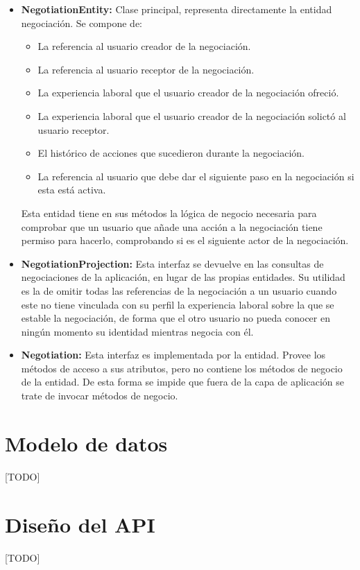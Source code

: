 \documentclass[a4paper, 12pt]{book}
\begin{document}
	\begin{itemize}
	\item \textbf{NegotiationEntity:} Clase principal, representa directamente la entidad negociación. 
	Se compone de:
		\begin{itemize}
		\item La referencia al usuario creador de la negociación.
		\item La referencia al usuario receptor de la negociación.
		\item La experiencia laboral que el usuario creador de la negociación ofreció.
		\item La experiencia laboral que el usuario creador de la negociación solictó al usuario receptor.
		\item El histórico de acciones que sucedieron durante la negociación.
		\item La referencia al usuario que debe dar el siguiente paso en la negociación si esta está activa.
		\end{itemize}
	Esta entidad tiene en sus métodos la lógica de negocio necesaria para comprobar que un usuario que añade una acción a la negociación tiene permiso para hacerlo, comprobando si es el siguiente actor de la negociación.
	\item \textbf{NegotiationProjection:} Esta interfaz se devuelve en las consultas de negociaciones de la aplicación, en lugar de las propias entidades.
	 Su utilidad es la de omitir todas las referencias de la negociación a un usuario cuando este no tiene vinculada con su perfil la experiencia laboral sobre la que se estable la negociación, de forma que el otro usuario no pueda conocer en ningún momento su identidad mientras negocia con él.	
	\item \textbf{Negotiation:} Esta interfaz es implementada por la entidad. Provee los métodos de acceso a sus atributos, pero no contiene los métodos de negocio de la entidad. De esta forma se impide que fuera de la capa de aplicación se trate de invocar métodos de negocio.
	\end{itemize}



\section{Modelo de datos} 
\label{sec:data_model}
[TODO]

\section{Diseño del API} 
\label{sec:api_desing}
[TODO]
\end{document}

